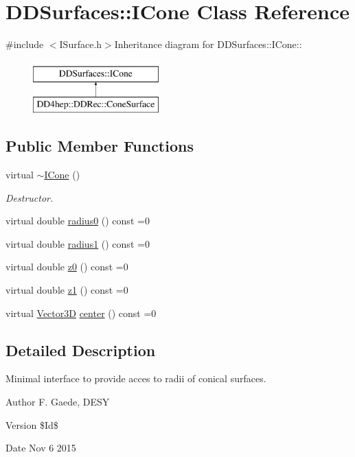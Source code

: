 \hypertarget{class_d_d_surfaces_1_1_i_cone}{
\section{DDSurfaces::ICone Class Reference}
\label{class_d_d_surfaces_1_1_i_cone}
}


{\ttfamily \#include $<$ISurface.h$>$}Inheritance diagram for DDSurfaces::ICone::\begin{figure}[H]
\begin{center}
\leavevmode
\includegraphics[height=2cm]{class_d_d_surfaces_1_1_i_cone}
\end{center}
\end{figure}
\subsection*{Public Member Functions}
\begin{DoxyCompactItemize}
\item 
virtual \hyperlink{class_d_d_surfaces_1_1_i_cone_a7693726c5c65f892a24e244b12acbf17}{$\sim$ICone} ()
\begin{DoxyCompactList}\small\item\em Destructor. \item\end{DoxyCompactList}\item 
virtual double \hyperlink{class_d_d_surfaces_1_1_i_cone_af7be60438f58e45d5e82a2d826a0a7d7}{radius0} () const =0
\item 
virtual double \hyperlink{class_d_d_surfaces_1_1_i_cone_a58fb9fc961cc2580a6cc1d5fda4d817e}{radius1} () const =0
\item 
virtual double \hyperlink{class_d_d_surfaces_1_1_i_cone_a306dd8443c146ce57ebf98f7f5c11013}{z0} () const =0
\item 
virtual double \hyperlink{class_d_d_surfaces_1_1_i_cone_a7bb86876e5f5196ea11ac78bcaa42dbc}{z1} () const =0
\item 
virtual \hyperlink{class_d_d_surfaces_1_1_vector3_d}{Vector3D} \hyperlink{class_d_d_surfaces_1_1_i_cone_a2543c4f2ec55d1ace4464652a0c89bce}{center} () const =0
\end{DoxyCompactItemize}


\subsection{Detailed Description}
Minimal interface to provide acces to radii of conical surfaces. \begin{DoxyAuthor}{Author}
F. Gaede, DESY 
\end{DoxyAuthor}
\begin{DoxyVersion}{Version}
\$Id\$ 
\end{DoxyVersion}
\begin{DoxyDate}{Date}
Nov 6 2015 
\end{DoxyDate}


